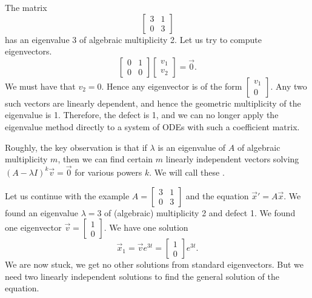 \begin{example}
The matrix
\begin{equation*}
\begin{bmatrix}
3 & 1 \\ 0 & 3
\end{bmatrix}
\end{equation*}
has an eigenvalue 3 of algebraic multiplicity 2.
Let us try to compute eigenvectors.
\begin{equation*}
\begin{bmatrix}
0 & 1 \\ 0 & 0
\end{bmatrix}
\begin{bmatrix}
v_1 \\ v_2
\end{bmatrix}
= \vec{0} .
\end{equation*}
We must have that $v_2 = 0$.  Hence any eigenvector is of the form
$\left[ \begin{smallmatrix} v_1 \\ 0 \end{smallmatrix} \right]$.  Any two
such vectors are linearly dependent, and hence the geometric multiplicity
of the eigenvalue is 1.  Therefore, the defect is 1, and we can no longer
apply the eigenvalue method directly to a system of ODEs with such a
coefficient matrix.

\medskip

Roughly, the key observation is that
if $\lambda$ is an eigenvalue of $A$ of algebraic multiplicity $m$,
then we can find certain $m$ linearly independent vectors
solving ${(A-\lambda I)}^k \vec{v} = \vec{0}$ for various powers
$k$.  We will call these \emph{}.

\medskip

Let us continue with the example
$A = \left[ \begin{smallmatrix}
3 & 1 \\ 0 & 3
\end{smallmatrix} \right]$ and the equation ${\vec{x}}' = A\vec{x}$.
We found an eigenvalue $\lambda=3$ of (algebraic) multiplicity 2 and defect 1.
We found one eigenvector 
$\vec{v} = \left[ \begin{smallmatrix} 1 \\ 0 \end{smallmatrix} \right]$.
We have one solution
\begin{equation*}
\vec{x}_1 = \vec{v} e^{3t} = \begin{bmatrix} 1 \\ 0 \end{bmatrix} e^{3t} .
\end{equation*}
We are now stuck, we get no other solutions from standard eigenvectors.  But
we need two linearly independent solutions to find the general solution of
the equation.


\end{example}
